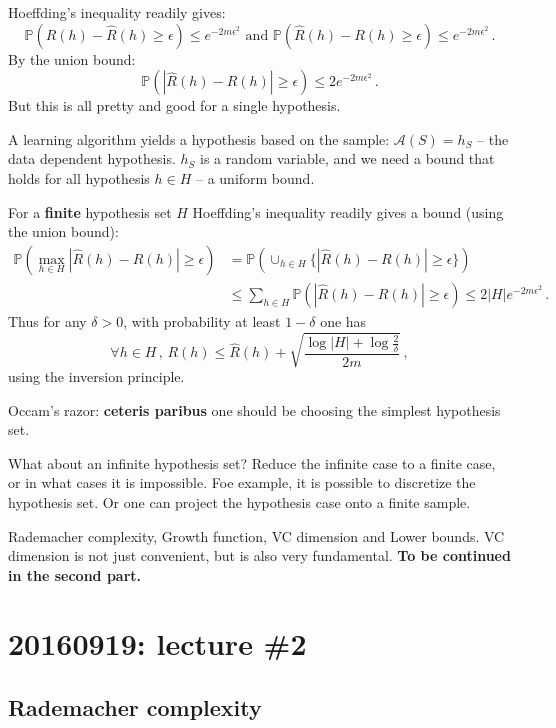 \documentclass[a4paper]{article}
\newcommand{\pr}{\mathbb{P}}
\begin{document}
Hoeffding's inequality readily gives:
\[ \pr(R(h) - \hat{R}(h) \geq \epsilon ) \leq e^{-2m\epsilon^2}
    \text{ and }
    \pr(\hat{R}(h) - R(h) \geq \epsilon ) \leq e^{-2m\epsilon^2}
\,.\]
By the union bound:
\[ \pr(|\hat{R}(h) - R(h)|\geq \epsilon ) \leq 2 e^{-2m\epsilon^2} \,.\]
But this is all pretty and good for a single hypothesis.

A learning algorithm yields a hypothesis based on the sample: $\mathcal{A}(S) = h_S$
-- the data dependent hypothesis. $h_S$ is a random variable, and we need a bound
that holds for all hypothesis $h\in H$ -- a uniform bound.

For a \textbf{finite} hypothesis set $H$ Hoeffding's inequality readily gives a
bound (using the union bound):
\begin{align*}
    \pr(\max_{h\in H} |\hat{R}(h) - R(h)|\geq \epsilon )
    &= \pr(\cup_{h\in H} \{|\hat{R}(h) - R(h)|\geq \epsilon\} ) \\
    &\leq \sum_{h\in H}\pr(|\hat{R}(h) - R(h)|\geq \epsilon )
     \leq 2 |H| e^{-2m\epsilon^2} \,.
\end{align*}
Thus for any $\delta > 0$, with probability at least $1-\delta$ one has
\[ \forall h\in H \,,\,
    R(h) \leq \hat{R}(h) + \sqrt{\frac{\log|H|
    + \log \frac{2}{\delta}}{2m}}
\,,\]
using the inversion principle.

Occam's razor: \textbf{ceteris paribus} one should be choosing the simplest hypothesis
set.

What about an infinite hypothesis set? Reduce the infinite case to a finite case, or
in what cases it is impossible. Foe example, it is possible to discretize the hypothesis
set. Or one can project the hypothesis case onto a finite sample.

Rademacher complexity, Growth function, VC dimension and Lower bounds. VC dimension is
not just convenient, but is also very fundamental.
\textbf{To be continued in the second part.}



\section{20160919: lecture \#2} %

\label{sec:20160919_lecture_2}

\subsection{Rademacher complexity} %
\label{sub:rademacher_complexity}
\end{document}
